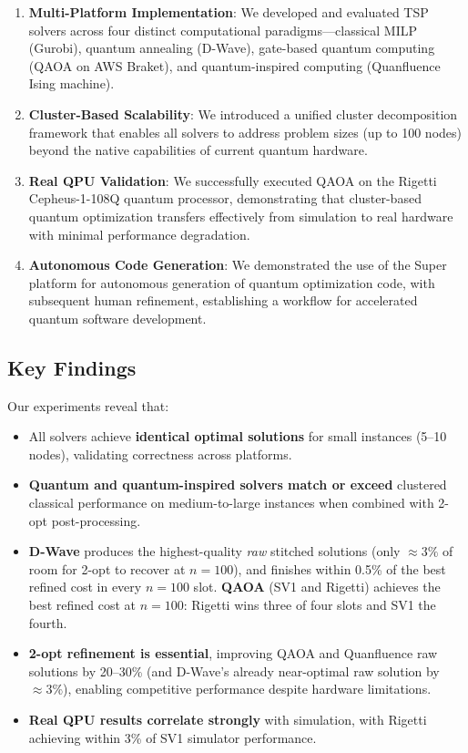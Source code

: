 \documentclass[conference]{IEEEtran}
\begin{document}
\begin{enumerate}
\item \textbf{Multi-Platform Implementation}: We developed and evaluated TSP solvers across four distinct computational paradigms---classical MILP (Gurobi), quantum annealing (D-Wave), gate-based quantum computing (QAOA on AWS Braket), and quantum-inspired computing (Quanfluence Ising machine).

\item \textbf{Cluster-Based Scalability}: We introduced a unified cluster decomposition framework that enables all solvers to address problem sizes (up to 100 nodes) beyond the native capabilities of current quantum hardware.

\item \textbf{Real QPU Validation}: We successfully executed QAOA on the Rigetti Cepheus-1-108Q quantum processor, demonstrating that cluster-based quantum optimization transfers effectively from simulation to real hardware with minimal performance degradation.

\item \textbf{Autonomous Code Generation}: We demonstrated the use of the Super platform for autonomous generation of quantum optimization code, with subsequent human refinement, establishing a workflow for accelerated quantum software development.
\end{enumerate}

\subsection{Key Findings}

Our experiments reveal that:
\begin{itemize}
\item All solvers achieve \textbf{identical optimal solutions} for small instances (5--10 nodes), validating correctness across platforms.
\item \textbf{Quantum and quantum-inspired solvers match or exceed} clustered classical performance on medium-to-large instances when combined with 2-opt post-processing.
\item \textbf{D-Wave} produces the highest-quality \emph{raw} stitched solutions (only $\approx 3\%$ of room for 2-opt to recover at $n=100$), and finishes within 0.5\% of the best refined cost in every $n=100$ slot. \textbf{QAOA} (SV1 and Rigetti) achieves the best refined cost at $n=100$: Rigetti wins three of four slots and SV1 the fourth.
\item \textbf{2-opt refinement is essential}, improving QAOA and Quanfluence raw solutions by 20--30\% (and D-Wave's already near-optimal raw solution by $\approx 3\%$), enabling competitive performance despite hardware limitations.
\item \textbf{Real QPU results correlate strongly} with simulation, with Rigetti achieving within 3\% of SV1 simulator performance.
\end{itemize}
\end{document}
